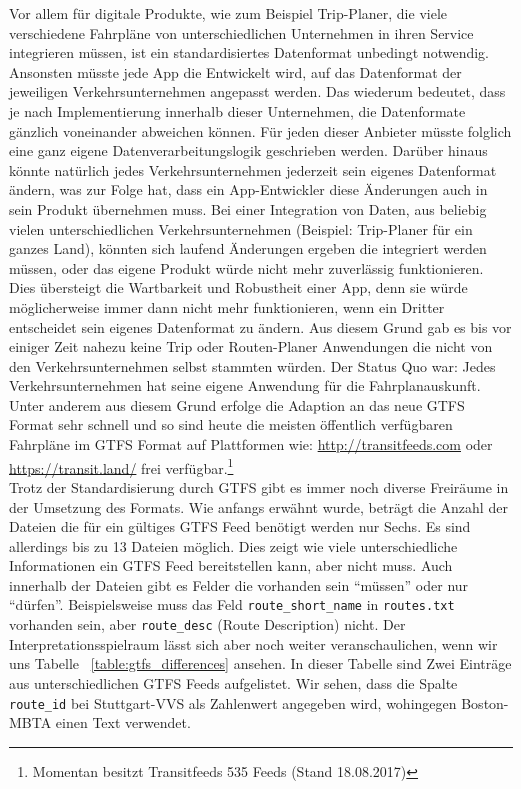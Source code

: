 \begin{newpage}
		Vor allem für digitale Produkte, wie zum Beispiel Trip-Planer, die viele verschiedene Fahrpläne von unterschiedlichen Unternehmen in ihren Service integrieren müssen, ist ein standardisiertes Datenformat unbedingt notwendig. 
		Ansonsten müsste jede App die Entwickelt wird, auf das Datenformat der jeweiligen Verkehrsunternehmen angepasst werden. Das wiederum bedeutet, dass je nach Implementierung innerhalb dieser Unternehmen, die Datenformate gänzlich voneinander abweichen können. Für jeden dieser Anbieter müsste folglich eine ganz eigene Datenverarbeitungslogik geschrieben werden.
    Darüber hinaus könnte natürlich jedes Verkehrsunternehmen jederzeit sein eigenes Datenformat ändern, was zur Folge hat, dass ein App-Entwickler diese Änderungen auch in sein Produkt übernehmen muss. Bei einer Integration von Daten, aus beliebig vielen unterschiedlichen Verkehrsunternehmen (Beispiel: Trip-Planer für ein ganzes Land), könnten sich laufend Änderungen ergeben die integriert werden müssen, oder das eigene Produkt würde nicht mehr zuverlässig funktionieren. Dies übersteigt die Wartbarkeit und Robustheit einer App, denn sie würde möglicherweise immer dann nicht mehr funktionieren, wenn ein Dritter entscheidet sein eigenes Datenformat zu ändern. Aus diesem Grund gab es bis vor einiger Zeit nahezu keine Trip oder Routen-Planer Anwendungen die nicht von den Verkehrsunternehmen selbst stammten würden. Der Status Quo war: Jedes Verkehrsunternehmen hat seine eigene Anwendung für die Fahrplanauskunft. Unter anderem aus diesem Grund erfolge die Adaption an das neue GTFS Format sehr schnell und so sind heute die meisten öffentlich verfügbaren Fahrpläne im GTFS Format auf Plattformen wie: \url{http://transitfeeds.com} oder \url{https://transit.land/} frei verfügbar.\footnote{Momentan besitzt Transitfeeds 535 Feeds (Stand 18.08.2017)}\\

    Trotz der Standardisierung durch GTFS gibt es immer noch diverse Freiräume in der Umsetzung des Formats. Wie anfangs erwähnt wurde, beträgt die Anzahl der Dateien die für ein gültiges GTFS Feed benötigt werden nur Sechs. Es sind allerdings bis zu 13 Dateien möglich. Dies zeigt wie viele unterschiedliche Informationen ein GTFS Feed bereitstellen kann, aber nicht muss. 
    Auch innerhalb der Dateien gibt es Felder die vorhanden sein "`müssen"' oder nur "`dürfen"'. Beispielsweise muss das Feld \texttt{route\_short\_name} in \texttt{routes.txt} vorhanden sein, aber \texttt{route\_desc} (Route Description) nicht. Der Interpretationsspielraum lässt sich aber noch weiter veranschaulichen, wenn wir uns Tabelle ~\ref{table:gtfs_differences} ansehen. In dieser Tabelle sind Zwei Einträge aus unterschiedlichen GTFS Feeds aufgelistet.
    Wir sehen, dass die Spalte \texttt{route\_id} bei Stuttgart-VVS als Zahlenwert angegeben wird, wohingegen Boston-MBTA einen Text verwendet.


\end{newpage}
